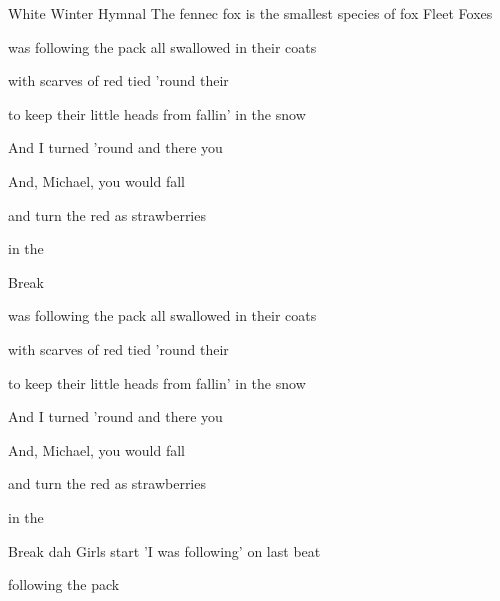 \begin{SBSong}{White Winter Hymnal}
  {The fennec fox is the smallest species of fox}
  {Fleet Foxes}
  \begin{SBVerse}
    
	 was following the pack all swallowed in their coats 

	with scarves of red tied 'round their 

	to keep their little heads from fallin' in the snow 

	And I turned 'round and there you 

	And, Michael, you would fall 

	and turn the   red as strawberries 

	in the 
  \end{SBVerse}
  \begin{SBBracket}{Break}
        
  \end{SBBracket}
  \begin{SBVerse}
	 was following the pack all swallowed in their coats 

	with scarves of red tied 'round their  

	to keep their little heads from fallin' in the snow 

	And I turned 'round and there you  

	And, Michael, you would fall 

	and turn the   red as strawberries 

	in the 
  \end{SBVerse}
  \begin{SBBracket}{Break}
     dah
	  
	  
	    
	Girls start 'I was following' on last beat
  \end{SBBracket}
  \begin{SBVerse}
	  following the pack 


\end{SBVerse}
\end{SBSong}
